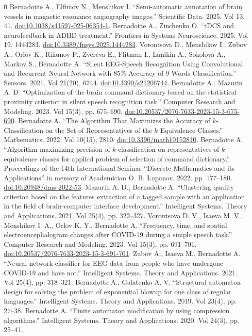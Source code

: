 \documentclass{article}
\begin{document}
\begin{thebibliography}{0}
 Bernadotte A., Elfimov N., Menshikov I. ``Semi-automatic annotation of brain vessels in magnetic resonance angiography images.'' Scientific Data. 2025. Vol 13, 41. \href{https://doi.org/10.1038/s41597-025-06354-1}{doi:10.1038/s41597-025-06354-1}.
 Bernadotte A., Zinchenko O. ``tDCS and neurofeedback in ADHD treatment.'' Frontiers in Systems Neuroscience. 2025. Vol 19, 1444283. \href{https://doi.org/10.3389/fnsys.2025.1444283}{doi:10.3389/fnsys.2025.1444283}.
 Vorontsova D., Menshikov I., Zubov A., Orlov K., Rikunov P., Zvereva E., Flitman I., Lanikin A., Sokolova A., Markov S., Bernadotte A. ``Silent EEG-Speech Recognition Using Convolutional and Recurrent Neural Network with 85\% Accuracy of 9 Words Classification.'' Sensors. 2021. Vol 21(20), 6744. \href{https://doi.org/10.3390/s21206744}{doi:10.3390/s21206744}.
 Bernadotte A., Mazurin A. D. ``Optimization of the brain command dictionary based on the statistical proximity criterion in silent speech recognition task.'' Computer Research and Modeling. 2023. Vol 15(3), pp. 675--690. \href{https://doi.org/10.20537/2076-7633-2023-15-3-675-690}{doi:10.20537/2076-7633-2023-15-3-675-690}.
 Bernadotte A. ``The Algorithm That Maximizes the Accuracy of $k$-Classification on the Set of Representatives of the $k$ Equivalence Classes.'' Mathematics. 2022. Vol 10(15), 2810. \href{https://doi.org/10.3390/math10152810}{doi:10.3390/math10152810}.
 Bernadotte A. ``Algorithm maximizing precision of $k$-classification on representatives of $k$ equivalence classes for applied problem of selection of command dictionary.'' Proceedings of the 14th International Seminar ``Discrete Mathematics and its Applications'' in memory of Academician O. B. Lupanov. 2022. pp. 177--180. \href{https://doi.org/10.20948/dms-2022-53}{doi:10.20948/dms-2022-53}.
 Mazurin A. D., Bernadotte A. ``Clustering quality criterion based on the features extraction of a tagged sample with an application in the field of brain-computer interface development.'' Intelligent Systems. Theory and Applications. 2021. Vol 25(4), pp. 322--327.
 Vorontsova D. V., Isaeva M. V., Menshikov I. A., Orlov K. Y., Bernadotte A. ``Frequency, time, and spatial electroencephalogram changes after COVID-19 during a simple speech task.'' Computer Research and Modeling. 2023. Vol 15(3), pp. 691--701. \href{https://doi.org/10.20537/2076-7633-2023-15-3-691-701}{doi:10.20537/2076-7633-2023-15-3-691-701}.
 Zubov A., Isaeva M., Bernadotte A. ``Neural network classifier for EEG data from people who have undergone COVID-19 and have not.'' Intelligent Systems. Theory and Applications. 2021. Vol 25(4), pp. 318--321.
 Bernadotte A., Galatenko A. V. ``Structural automaton design for solving the problem of exponential blowup for one class of regular languages.'' Intelligent Systems. Theory and Applications. 2019. Vol 23(4), pp. 27--38.
 Bernadotte A. ``Finite automaton modification by using compression algorithms.'' Intelligent Systems. Theory and Applications. 2020. Vol 24(3), pp. 25--41.

 
\end{thebibliography}
\end{document}

